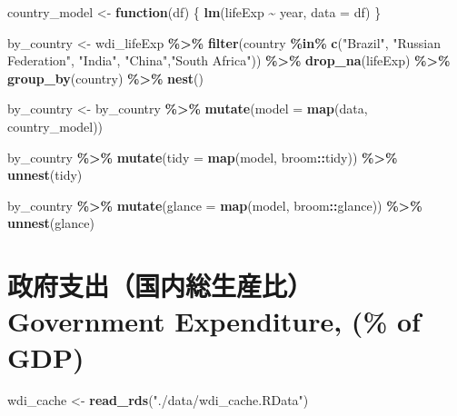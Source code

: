 \documentclass[
  xelatex, ja=standard]{bxjsbook}
\newenvironment{Shaded}{\begin{snugshade}}{\end{snugshade}}
\newcommand{\AttributeTok}[1]{\textcolor[rgb]{0.13,0.29,0.53}{#1}}
\newcommand{\ControlFlowTok}[1]{\textcolor[rgb]{0.13,0.29,0.53}{\textbf{#1}}}
\newcommand{\FunctionTok}[1]{\textcolor[rgb]{0.13,0.29,0.53}{\textbf{#1}}}
\newcommand{\NormalTok}[1]{#1}
\newcommand{\OtherTok}[1]{\textcolor[rgb]{0.56,0.35,0.01}{#1}}
\newcommand{\SpecialCharTok}[1]{\textcolor[rgb]{0.81,0.36,0.00}{\textbf{#1}}}
\newcommand{\StringTok}[1]{\textcolor[rgb]{0.31,0.60,0.02}{#1}}
\theoremstyle{definition}
\theoremstyle{definition}
\theoremstyle{definition}
\theoremstyle{definition}
\theoremstyle{remark}
\begin{document}
\begin{Shaded}
\begin{Highlighting}[]
\NormalTok{country\_model }\OtherTok{\textless{}{-}} \ControlFlowTok{function}\NormalTok{(df) \{}
  \FunctionTok{lm}\NormalTok{(lifeExp }\SpecialCharTok{\textasciitilde{}}\NormalTok{ year, }\AttributeTok{data =}\NormalTok{ df)}
\NormalTok{\}}

\NormalTok{by\_country }\OtherTok{\textless{}{-}}\NormalTok{ wdi\_lifeExp }\SpecialCharTok{\%\textgreater{}\%} \FunctionTok{filter}\NormalTok{(country }\SpecialCharTok{\%in\%} \FunctionTok{c}\NormalTok{(}\StringTok{"Brazil"}\NormalTok{, }\StringTok{"Russian Federation"}\NormalTok{, }\StringTok{"India"}\NormalTok{, }\StringTok{"China"}\NormalTok{,}\StringTok{"South Africa"}\NormalTok{)) }\SpecialCharTok{\%\textgreater{}\%} \FunctionTok{drop\_na}\NormalTok{(lifeExp) }\SpecialCharTok{\%\textgreater{}\%} \FunctionTok{group\_by}\NormalTok{(country) }\SpecialCharTok{\%\textgreater{}\%} \FunctionTok{nest}\NormalTok{()}

\NormalTok{by\_country }\OtherTok{\textless{}{-}}\NormalTok{ by\_country }\SpecialCharTok{\%\textgreater{}\%} 
  \FunctionTok{mutate}\NormalTok{(}\AttributeTok{model =} \FunctionTok{map}\NormalTok{(data, country\_model))}

\NormalTok{by\_country }\SpecialCharTok{\%\textgreater{}\%} 
  \FunctionTok{mutate}\NormalTok{(}\AttributeTok{tidy =} \FunctionTok{map}\NormalTok{(model, broom}\SpecialCharTok{::}\NormalTok{tidy)) }\SpecialCharTok{\%\textgreater{}\%} 
  \FunctionTok{unnest}\NormalTok{(tidy)}

\NormalTok{by\_country }\SpecialCharTok{\%\textgreater{}\%} 
  \FunctionTok{mutate}\NormalTok{(}\AttributeTok{glance =} \FunctionTok{map}\NormalTok{(model, broom}\SpecialCharTok{::}\NormalTok{glance)) }\SpecialCharTok{\%\textgreater{}\%} 
  \FunctionTok{unnest}\NormalTok{(glance)}
\end{Highlighting}
\end{Shaded}

\hypertarget{ux653fux5e9cux652fux51faux56fdux5185ux7dcfux751fux7523ux6bd4government-expenditure-of-gdp}{%
\section{政府支出（国内総生産比）Government Expenditure, (\% of GDP)}\label{ux653fux5e9cux652fux51faux56fdux5185ux7dcfux751fux7523ux6bd4government-expenditure-of-gdp}}

\begin{Shaded}
\begin{Highlighting}[]
\NormalTok{wdi\_cache }\OtherTok{\textless{}{-}} \FunctionTok{read\_rds}\NormalTok{(}\StringTok{"./data/wdi\_cache.RData"}\NormalTok{)}
\end{Highlighting}
\end{Shaded}
\end{document}
